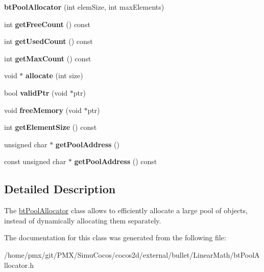 \begin{DoxyCompactItemize}
{\bfseries bt\+Pool\+Allocator} (int elem\+Size, int max\+Elements)
\item 
\mbox{\label{classbtPoolAllocator_a81c9f44a991e1a1871ff9ba41308e85d}} 
int {\bfseries get\+Free\+Count} () const
\item 
\mbox{\label{classbtPoolAllocator_add80f1642da714033fd0416fa0e9d27c}} 
int {\bfseries get\+Used\+Count} () const
\item 
\mbox{\label{classbtPoolAllocator_a94af9be67306f3880ded5f1ad9420945}} 
int {\bfseries get\+Max\+Count} () const
\item 
\mbox{\label{classbtPoolAllocator_ae2d7e02c7ba5f6d713d9e8aa740095ca}} 
void $\ast$ {\bfseries allocate} (int size)
\item 
\mbox{\label{classbtPoolAllocator_a56dc7a155cfd52bffc5efe933261b6c6}} 
bool {\bfseries valid\+Ptr} (void $\ast$ptr)
\item 
\mbox{\label{classbtPoolAllocator_a26bf2c983bc378c3da96ee218861b65f}} 
void {\bfseries free\+Memory} (void $\ast$ptr)
\item 
\mbox{\label{classbtPoolAllocator_a458d373ede5ee4bded615bf7995fcc4d}} 
int {\bfseries get\+Element\+Size} () const
\item 
\mbox{\label{classbtPoolAllocator_a80d1a161e54fd676d7a4da5f98bd3686}} 
unsigned char $\ast$ {\bfseries get\+Pool\+Address} ()
\item 
\mbox{\label{classbtPoolAllocator_ab9df25899c0b922c4bb2c8ae82fc317d}} 
const unsigned char $\ast$ {\bfseries get\+Pool\+Address} () const
\end{DoxyCompactItemize}


\subsection{Detailed Description}
The \hyperlink{classbtPoolAllocator}{bt\+Pool\+Allocator} class allows to efficiently allocate a large pool of objects, instead of dynamically allocating them separately. 

The documentation for this class was generated from the following file\+:\begin{DoxyCompactItemize}
\item 
/home/pmx/git/\+P\+M\+X/\+Simu\+Cocos/cocos2d/external/bullet/\+Linear\+Math/bt\+Pool\+Allocator.\+h\end{DoxyCompactItemize}
